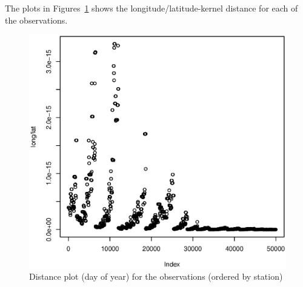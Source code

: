 \documentclass[a4paper, twocolumn]{article}
\begin{document}
    The plots in Figures~\ref{fig:dist} shows the longitude/latitude-kernel distance for each of the observations.  
    \begin{figure}[!h]
    \centering
    \caption{Distance plot (day of year) for the observations (ordered by station)\label{fig:dist}}
	    \begin{minipage}[]{0.4\textwidth}
	    	\includegraphics[width=\textwidth]{share/1_dist.eps}
	    \end{minipage}
    \end{figure}
\end{document}
